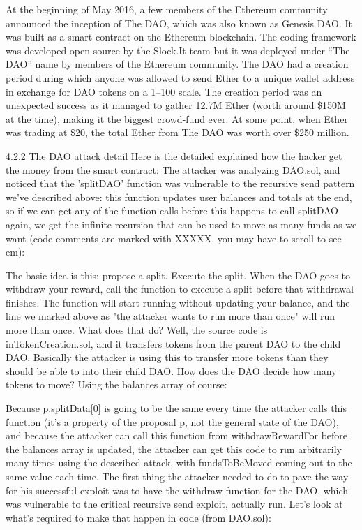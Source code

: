 At the beginning of May 2016, a few members of the Ethereum community announced the inception of The DAO, which was also known as Genesis DAO. It was built as a smart contract on the Ethereum blockchain. The coding framework was developed open source by the Slock.It team but it was deployed under “The DAO” name by members of the Ethereum community. The DAO had a creation period during which anyone was allowed to send Ether to a unique wallet address in exchange for DAO tokens on a 1–100 scale. The creation period was an unexpected success as it managed to gather 12.7M Ether (worth around \$150M at the time), making it the biggest crowd-fund ever. At some point, when Ether was trading at \$20, the total Ether from The DAO was worth over \$250 million.

4.2.2 The DAO attack detail
Here is the detailed explained how the hacker get the money from the smart contract: The attacker was analyzing DAO.sol, and noticed that the 'splitDAO' function was vulnerable to the recursive send pattern we've described above: this function updates user balances and totals at the end, so if we can get any of the function calls before this happens to call splitDAO again, we get the infinite recursion that can be used to move as many funds as we want (code comments are marked with XXXXX, you may have to scroll to see em):




The basic idea is this: propose a split. Execute the split. When the DAO goes to withdraw your reward, call the function to execute a split before that withdrawal finishes. The function will start running without updating your balance, and the line we marked above as "the attacker wants to run more than once" will run more than once. What does that do? Well, the source code is inTokenCreation.sol, and it transfers tokens from the parent DAO to the child DAO. Basically the attacker is using this to transfer more tokens than they should be able to into their child DAO.
How does the DAO decide how many tokens to move? Using the balances array of course:

Because p.splitData[0] is going to be the same every time the attacker calls this function (it's a property of the proposal p, not the general state of the DAO), and because the attacker can call this function from withdrawRewardFor before the balances array is updated, the attacker can get this code to run arbitrarily many times using the described attack, with fundsToBeMoved coming out to the same value each time.
The first thing the attacker needed to do to pave the way for his successful exploit was to have the withdraw function for the DAO, which was vulnerable to the critical recursive send exploit, actually run. Let's look at what's required to make that happen in code (from DAO.sol):


